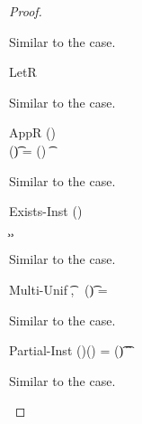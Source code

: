 \documentclass[acmsmall,screen,nonacm,review]{acmart}
\begin{document}
\begin{theorem}[Canonicalization]
\begin{proof}
\begin{proofcases}
      \begin{llproof}
	Similar to the  case.
      \end{llproof}

      \proofcasederivation
	{LetR}
	{\semenv \th \cexists {\tv, \tvs} \ca \\
	 \semenv\where{\x \is \semenv(\cabsr \tv \tvs \ca)} \th \cb}
	{\semenv \th \cletr \x \tv \tvs \ca \cb}

      \begin{llproof}
	Similar to the  case.
      \end{llproof}

      \proofcasederivation
	{AppR}
	{\greg \tv \semenvp \in \semenv(\x) \\
	 \semenv(\t) = \semenvp(\tv)}
	{\semenv \th \capp \x \t}

      \begin{llproof}
	Similar to the  case.
      \end{llproof}

    \proofcasederivation
      {Exists-Inst}
      {\greg \tv \semenvp \in \semenv(\x) \\ \semenv\where{\inst \is \semenvp} \th \c}
      {\semenv \th \cexistsi \inst \x \c}

      \begin{llproof}
	Similar to the  case.
      \end{llproof}


    \proofcasederivation
      {Multi-Unif}
      {\forall \t \in \ueq,~ \semenv(\t) = \gt}
      {\semenv \th \ueq}

      \begin{llproof}
	Similar to the  case.
      \end{llproof}

    \proofcasederivation
      {Partial-Inst}
      {\semenv(\inst)(\tv) = \semenv(\t)}
      {\semenv \th \cpinst \inst \tv \t}


      \begin{llproof}
	Similar to the  case.
      \end{llproof}


  \end{proofcases}
  \end{proof}
\end{theorem}
\end{document}
